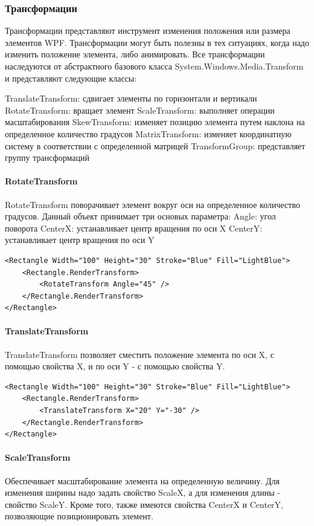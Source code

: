 \subsubsection{Трансформации}

Трансформации представляют инструмент изменения положения или размера элементов WPF. Трансформации могут быть полезны в тех ситуациях, когда надо изменить положение элемента, либо анимировать. Все трансформации наследуются от абстрактного базового класса System.Windows.Media.Transform и представляют следующие классы:

TranslateTransform: сдвигает элементы по горизонтали и вертикали
RotateTransform: вращает элемент
ScaleTransform: выполняет операции масштабирования
SkewTransform: изменяет позицию элемента путем наклона на определенное количество градусов
MatrixTransform: изменяет координатную систему в соответствии с определенной матрицей
TransformGroup: представляет группу трансформаций

\paragraph{RotateTransform}

RotateTransform поворачивает элемент вокруг оси на определенное количество градусов. Данный объект принимает три основых параметра:
Angle: угол поворота
CenterX: устанавливает центр вращения по оси X
CenterY: устанавливает центр вращения по оси Y

\begin{verbatim}
<Rectangle Width="100" Height="30" Stroke="Blue" Fill="LightBlue">
    <Rectangle.RenderTransform>
        <RotateTransform Angle="45" />
    </Rectangle.RenderTransform>
</Rectangle>
\end{verbatim}

\paragraph{TranslateTransform}
TranslateTransform позволяет сместить положение элемента по оси X, с помощью свойства X, и по оси Y - с помощью свойства Y.

\begin{verbatim}
<Rectangle Width="100" Height="30" Stroke="Blue" Fill="LightBlue">
    <Rectangle.RenderTransform>
        <TranslateTransform X="20" Y="-30" />
    </Rectangle.RenderTransform>
</Rectangle>
\end{verbatim}

\paragraph{ScaleTransform}
Обеспечивает масштабирование элемента на определенную величину. Для изменения ширины надо задать свойство ScaleX, а для изменения длины - свойство ScaleY. Кроме того, также имеются свойства CenterX и CenterY, позволяющие позиционировать элемент.

